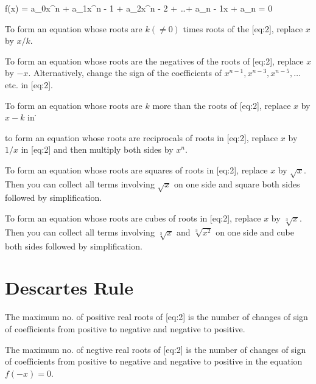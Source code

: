 \placeformula[eq:2]
\startformula
  f(x) = a_0x^n + a_1x^{n - 1} + a_2x^{n - 2} + \ldots + a_{n - 1}x + a_n = 0
\stopformula
\startitemize[n]
\item To form an equation whose roots are $k(\neq 0)$ times roots of the [eq:2], replace $x$ by $x/k$.
\item To form an equation whose roots are the negatives of the roots of [eq:2], replace $x$ by $-x$. Alternatively, change
  the sign of the coefficients of $x^{n - 1}, x^{n - 3}, x^{n - 5}, \ldots$ etc. in [eq:2].
\item To form an equation whose roots are $k$ more than the roots of [eq:2], replace $x$ by $x - k$ in \.
\item to form an equation whose roots are reciprocals of roots in [eq:2], replace $x$ by $1/x$ in [eq:2] and then
  multiply both sides by $x^n$.
\item To form an equation whose roots are squares of roots in [eq:2], replace $x$ by $\sqrt{x}$. Then you can collect all
  terms involving $\sqrt{x}$ on one side and square both sides followed by simplification.
\item To form an equation whose roots are cubes of roots in [eq:2], replace $x$ by $\sqrt[3]{x}$. Then you can collect all
  terms involving $\sqrt[3]{x}$ and $\sqrt[3]{x^2}$ on one side and cube both sides followed by simplification.
\stopitemize

\section{Descartes Rule}
\startitemize[n]
\item[Rule 1:] The maximum no. of positive real roots of [eq:2] is the number of changes of sign of coefficients from
  positive to negative and negative to positive.
\item[Rule 2:] The maximum no. of negtive real roots of [eq:2] is the number of changes of sign of coefficients from
  positive to negative and negative to positive in the equation $f(-x) = 0$.
\stopitemize

